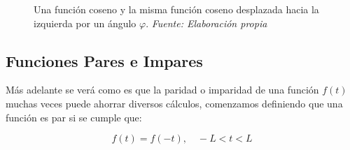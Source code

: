 \begin{figure}[H]
\begin{minipage}{0.5\textwidth}
	\end{minipage}
	\caption[Una función coseno y la misma función coseno desplazada hacia la izquierda por un ángulo $\varphi$.] {Una función coseno y la misma función coseno desplazada hacia la izquierda por un ángulo $\varphi$.\textit{ Fuente: Elaboración propia}  }
	\label{fig:fase-coseno}  %
\end{figure}

\subsection{Funciones Pares e Impares}
Más adelante se verá como es que la paridad o imparidad de una función $f(t)$ muchas veces puede ahorrar diversos cálculos, comenzamos definiendo que una función es par si se cumple que: ~\cite{matesAvanzadasZill}

\begin{equation} \label{eq24}
	f(t) = f(-t) , \quad -L < t < L
\end{equation}

